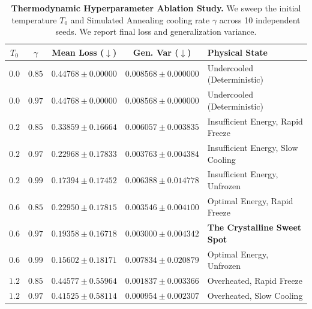\begin{table}[t]
\caption{\textbf{Thermodynamic Hyperparameter Ablation Study.} We sweep the initial temperature $T_0$ and Simulated Annealing cooling rate $\gamma$ across 10 independent seeds. We report final loss and generalization variance.}
\label{tab:ablation_results}
\vskip 0.15in
\begin{center}
\begin{small}
\begin{sc}
\begin{tabular}{ccccl}
\toprule
$T_0$ & $\gamma$ & Mean Loss ($\downarrow$) & Gen. Var ($\downarrow$) & Physical State \\
\midrule
$0.0$ & $0.85$ & $0.44768 \pm 0.00000$ & $0.008568 \pm 0.000000$ & Undercooled (Deterministic) \\
$0.0$ & $0.97$ & $0.44768 \pm 0.00000$ & $0.008568 \pm 0.000000$ & Undercooled (Deterministic) \\
\midrule
$0.2$ & $0.85$ & $0.33859 \pm 0.16664$ & $0.006057 \pm 0.003835$ & Insufficient Energy, Rapid Freeze \\
$0.2$ & $0.97$ & $0.22968 \pm 0.17833$ & $0.003763 \pm 0.004384$ & Insufficient Energy, Slow Cooling \\
$0.2$ & $0.99$ & $0.17394 \pm 0.17452$ & $0.006388 \pm 0.014778$ & Insufficient Energy, Unfrozen \\
\midrule
$0.6$ & $0.85$ & $0.22950 \pm 0.17815$ & $0.003546 \pm 0.004100$ & Optimal Energy, Rapid Freeze \\
$\mathbf{0.6}$ & $\mathbf{0.97}$ & $\mathbf{0.19358 \pm 0.16718}$ & $\mathbf{0.003000 \pm 0.004342}$ & \textbf{The Crystalline Sweet Spot} \\
$0.6$ & $0.99$ & $0.15602 \pm 0.18171$ & $0.007834 \pm 0.020879$ & Optimal Energy, Unfrozen \\
\midrule
$1.2$ & $0.85$ & $0.44577 \pm 0.55964$ & $0.001837 \pm 0.003366$ & Overheated, Rapid Freeze \\
$1.2$ & $0.97$ & $0.41525 \pm 0.58114$ & $0.000954 \pm 0.002307$ & Overheated, Slow Cooling \\
\bottomrule
\end{tabular}
\end{sc}
\end{small}
\end{center}
\vskip -0.1in
\end{table}

